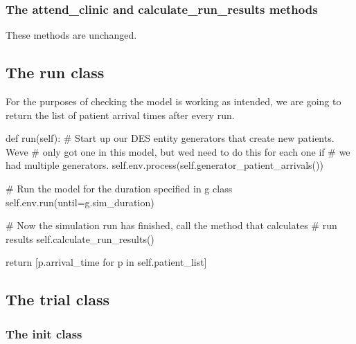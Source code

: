\documentclass[
  letterpaper,
  DIV=11,
  numbers=noendperiod]{scrreprt}
\newenvironment{Shaded}{}{}
\newcommand{\CommentTok}[1]{\textcolor[rgb]{0.42,0.45,0.49}{#1}}
\newcommand{\ControlFlowTok}[1]{\textcolor[rgb]{0.84,0.23,0.29}{#1}}
\newcommand{\KeywordTok}[1]{\textcolor[rgb]{0.84,0.23,0.29}{#1}}
\newcommand{\NormalTok}[1]{\textcolor[rgb]{0.14,0.16,0.18}{#1}}
\newcommand{\OperatorTok}[1]{\textcolor[rgb]{0.14,0.16,0.18}{#1}}
\newcommand{\VariableTok}[1]{\textcolor[rgb]{0.89,0.38,0.04}{#1}}
\begin{document}
\subsubsection{The attend\_clinic and calculate\_run\_results
methods}\label{the-attend_clinic-and-calculate_run_results-methods}

These methods are unchanged.

\subsection{The run class}\label{the-run-class}

For the purposes of checking the model is working as intended, we are
going to return the list of patient arrival times after every run.

\begin{Shaded}
\begin{Highlighting}[]
    \KeywordTok{def}\NormalTok{ run(}\VariableTok{self}\NormalTok{):}
        \CommentTok{\# Start up our DES entity generators that create new patients.  We\textquotesingle{}ve}
        \CommentTok{\# only got one in this model, but we\textquotesingle{}d need to do this for each one if}
        \CommentTok{\# we had multiple generators.}
        \VariableTok{self}\NormalTok{.env.process(}\VariableTok{self}\NormalTok{.generator\_patient\_arrivals())}

        \CommentTok{\# Run the model for the duration specified in g class}
        \VariableTok{self}\NormalTok{.env.run(until}\OperatorTok{=}\NormalTok{g.sim\_duration)}

        \CommentTok{\# Now the simulation run has finished, call the method that calculates}
        \CommentTok{\# run results}
        \VariableTok{self}\NormalTok{.calculate\_run\_results()}

        \ControlFlowTok{return}\NormalTok{ [p.arrival\_time }\ControlFlowTok{for}\NormalTok{ p }\KeywordTok{in} \VariableTok{self}\NormalTok{.patient\_list]}
\end{Highlighting}
\end{Shaded}

\subsection{The trial class}\label{the-trial-class-6}

\subsubsection{\texorpdfstring{The \textbf{init}
class}{The init class}}\label{the-init-class}
\end{document}
